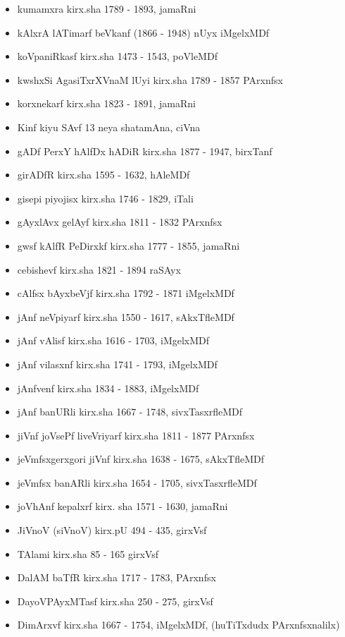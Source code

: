 {\begin{itemize}
\item kumamxra kirx.sha {\rm 1789 - 1893}, jamaRni
\item kAlxrA lATimarf beVkanf {\rm (1866 - 1948)} nUyx iMgelxMDf
\item koVpaniRkasf kirx.sha {\rm 1473 - 1543}, poVleMDf
\item kwshxSi AgasiTxrXVnaM lUyi kirx.sha {\rm 1789 - 1857} PArxnfsx
\item korxnekarf kirx.sha {\rm 1823 - 1891}, jamaRni
\item Kinf kiyu SAvf {\rm 13} neya shatamAna, ciVna
\item gADf PerxY hAlfDx hADiR kirx.sha {\rm 1877 - 1947}, birxTanf
\item girADfR kirx.sha {\rm 1595 - 1632}, hAleMDf
\item gisepi piyojisx kirx.sha {\rm 1746 - 1829}, iTali
\item gAyxlAvx gelAyf kirx.sha {\rm 1811 - 1832} PArxnfsx
\item gwsf kAlfR PeDirxkf kirx.sha {\rm 1777 - 1855}, jamaRni
\item cebishevf kirx.sha {\rm 1821 - 1894} raSAyx
\item cAlfsx bAyxbeVjf kirx.sha {\rm 1792 - 1871} iMgelxMDf
\item jAnf neVpiyarf kirx.sha {\rm 1550 - 1617}, sAkxTfleMDf
\item jAnf vAlisf kirx.sha {\rm 1616 - 1703}, iMgelxMDf
\item jAnf vilasxnf kirx.sha {\rm 1741 - 1793}, iMgelxMDf
\item jAnfvenf kirx.sha {\rm 1834 - 1883}, iMgelxMDf
\item jAnf banURli kirx.sha {\rm 1667 - 1748}, sivxTasxrfleMDf
\item jiVnf joVsePf liveVriyarf kirx.sha {\rm 1811 - 1877} PArxnfsx
\item jeVmfsxgerxgori jiVnf kirx.sha {\rm 1638 - 1675}, sAkxTfleMDf
\item jeVmfsx banARli kirx.sha {\rm 1654 - 1705}, sivxTasxrfleMDf
\item joVhAnf kepalxrf kirx. sha {\rm 1571 - 1630}, jamaRni
\item JiVnoV (siVnoV) kirx.pU {\rm 494 - 435}, girxVsf
\item TAlami kirx.sha {\rm 85 - 165} girxVsf
\item DalAM baTfR kirx.sha {\rm 1717 - 1783}, PArxnfsx
\item DayoVPAyxMTasf kirx.sha {\rm 250 - 275}, girxVsf
\item DimArxvf kirx.sha {\rm 1667 - 1754}, iMgelxMDf, (huTiTxdudx PArxnfsxnalilx)

\end{itemize}}
